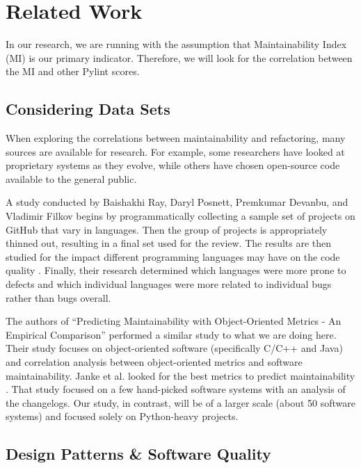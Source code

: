 
\section{Related Work} \label{sectionRelatedWork}

In our research, we are running with the assumption that Maintainability Index (MI) is our primary indicator. Therefore, we will look for the correlation between the MI and other Pylint scores.

\subsection{Considering Data Sets}

When exploring the correlations between maintainability and refactoring, many sources are available for research. For example, some researchers have looked at proprietary systems as they evolve, while others have chosen open-source code available to the general public.

A study conducted by Baishakhi Ray, Daryl Posnett, Premkumar Devanbu, and Vladimir Filkov begins by programmatically collecting a sample set of projects on GitHub that vary in languages. Then the group of projects is appropriately thinned out, resulting in a final set used for the review. The results are then studied for the impact different programming languages may have on the code quality \cite{baishakhi:2017}. Finally, their research determined which languages were more prone to defects and which individual languages were more related to individual bugs rather than bugs overall.

The authors of ``Predicting Maintainability with Object-Oriented Metrics - An Empirical Comparison'' performed a similar study to what we are doing here. Their study focuses on object-oriented software (specifically C/C++ and Java) and correlation analysis between object-oriented metrics and software maintainability. Janke et al. looked for the best metrics to predict maintainability \cite{janke:2003}. That study focused on a few hand-picked software systems with an analysis of the changelogs. Our study, in contrast, will be of a larger scale (about 50 software systems) and focused solely on Python-heavy projects.

\subsection{Design Patterns \& Software Quality}

